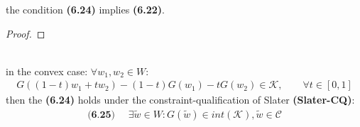 \begin{theorem}
	the condition \textbf{(6.24)} implies \textbf{(6.22)}.
\end{theorem}
\begin{proof}
\end{proof}
\quad\\
in the convex case: $\forall w_1, w_2 \in W$:
\begin{align*}
	G((1 - t)w_1 + tw_2) - (1 - t) G(w_1) - tG(w_2) \in \mathcal{K}, \qquad \forall t \in [0, 1]
\end{align*}
then the \textbf{(6.24)} holds under the constraint-qualification of Slater \textbf{(Slater-CQ)}: 
\begin{align*}
\textbf{(6.25) }\quad
	\exists \tilde{w} \in W: G(\tilde{w}) \in int(\mathcal{K}), \tilde{w} \in \mathcal{C}
\end{align*}

